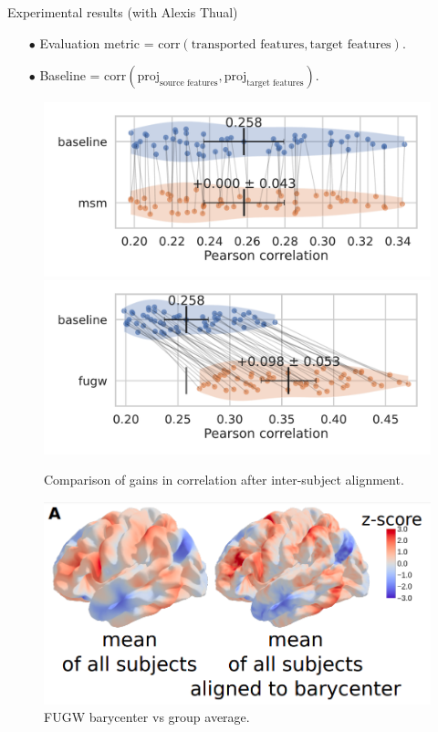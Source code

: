 \documentclass{beamer}
\begin{document}
\begin{frame}{Experimental results (with Alexis Thual)}
\scriptsize
\begin{itemize}
  \item[$\bullet$] Evaluation metric = $\text{corr}(\text{transported features}, \text{target features})$.
  \item[$\bullet$] Baseline = $\text{corr}(\text{proj}_{\text{source features}}, \text{proj}_{\text{target features}})$.
\end{itemize}
\begin{figure}
  \centering
  \includegraphics[width=0.49\linewidth, keepaspectratio=true]{OT_new/fsaverage5_alignment_correlation_gain_msm.pdf}
  \includegraphics[width=0.49\linewidth, keepaspectratio=true]{OT_new/fsaverage5_alignment_correlation_gain_fugw.pdf}
  \caption*{\scriptsize{Comparison of gains in correlation after inter-subject alignment.}}
\end{figure}

\vspace{-0.2cm}
\begin{figure}
  \centering
  \includegraphics[width=0.4\linewidth, keepaspectratio=true]{OT_new/brain_template.png}
  \caption*{\scriptsize{FUGW barycenter vs group average.}}
\end{figure}


\end{frame}
\end{document}
